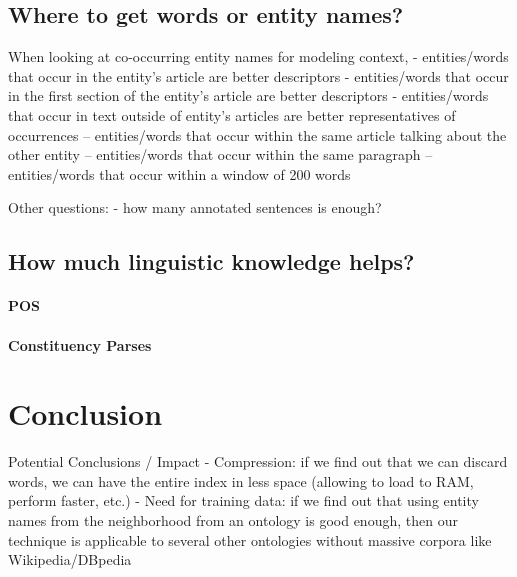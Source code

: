 \documentclass[10pt,a4paper]{article}
\newcommand{\todo}[1]{{\color{red}\textsf{\textbf{TODO}}: #1}}
\begin{document}
\subsection{Where to get words or entity names?}

When looking at co-occurring entity names for modeling context,
- entities/words that occur in the entity's article are better descriptors
- entities/words that occur in the first section of the entity's article are better descriptors
- entities/words that occur in text outside of entity's articles are better representatives of occurrences
-- entities/words that occur within the same article talking about the other entity
-- entities/words that occur within the same paragraph
-- entities/words that occur within a window of 200 words

Other questions:
- how many annotated sentences is enough?

\subsection{How much linguistic knowledge helps?}

\paragraph{POS}


\paragraph{Constituency Parses}



\section{Conclusion}

Potential Conclusions / Impact
- Compression: if we find out that we can discard words, we can have the entire index in less space (allowing to load to RAM, perform faster, etc.)
- Need for training data: if we find out that using entity names from the neighborhood from an ontology is good enough, then our technique is applicable to several other ontologies without massive corpora like Wikipedia/DBpedia



\end{document}
